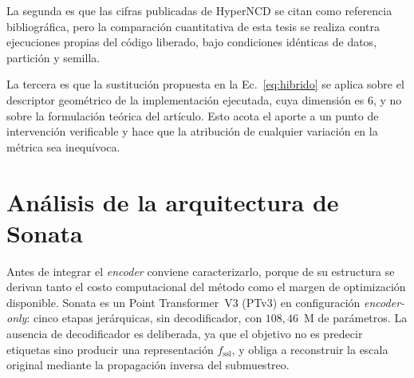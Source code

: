La segunda es que las cifras publicadas de HyperNCD se citan como referencia
bibliográfica, pero la comparación cuantitativa de esta tesis se realiza contra
ejecuciones propias del código liberado, bajo condiciones idénticas de datos,
partición y semilla.

La tercera es que la sustitución propuesta en la Ec.~\eqref{eq:hibrido} se
aplica sobre el descriptor geométrico de la implementación ejecutada, cuya
dimensión es 6, y no sobre la formulación teórica del artículo. Esto acota el
aporte a un punto de intervención verificable y hace que la atribución de
cualquier variación en la métrica sea inequívoca.

\section{Análisis de la arquitectura de Sonata}
\label{sec:arq-sonata}

Antes de integrar el \emph{encoder} conviene caracterizarlo, porque de su
estructura se derivan tanto el costo computacional del método como el margen de
optimización disponible. Sonata es un Point Transformer~V3 (PTv3) en
configuración \emph{encoder-only}: cinco etapas jerárquicas, sin decodificador,
con $108{,}46$~M de parámetros. La ausencia de decodificador es deliberada, ya
que el objetivo no es predecir etiquetas sino producir una representación
$f_{\mathrm{ssl}}$, y obliga a reconstruir la escala original mediante la
propagación inversa del submuestreo.

